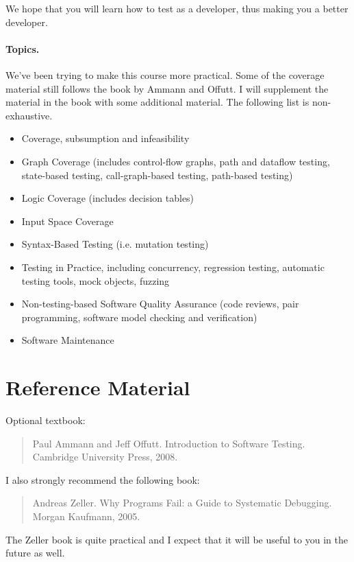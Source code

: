 \documentclass{article}
\begin{document}
We hope that you will learn how to test as a developer, thus making
you a better developer. 

\paragraph{Topics.}
We've been trying to make this course more practical.  Some of the
coverage material still follows the book by Ammann and Offutt. I will
supplement the material in the book with some additional material. The
following list is non-exhaustive.

\begin{itemize}
\item Coverage, subsumption and infeasibility
\item Graph Coverage (includes control-flow graphs, path and dataflow testing, state-based testing, call-graph-based testing, path-based testing)
\item Logic Coverage (includes decision tables)
\item Input Space Coverage
\item Syntax-Based Testing (i.e. mutation testing)
\item Testing in Practice, including concurrency, regression testing, automatic testing tools, mock objects, fuzzing
\item Non-testing-based Software Quality Assurance (code reviews, pair
programming, software model checking and verification)
\item Software Maintenance
\end{itemize}

\section*{Reference Material}
Optional textbook:
\begin{quote}
    Paul Ammann and Jeff Offutt. Introduction to Software Testing. Cambridge University Press, 2008.
\end{quote}

\noindent I also strongly recommend the following book:

\begin{quote}
    Andreas Zeller. Why Programs Fail: a Guide to Systematic Debugging. Morgan Kaufmann, 2005.
\end{quote}

\noindent The Zeller book is quite practical and I expect that it will be useful to you in the future as well.
\end{document}
